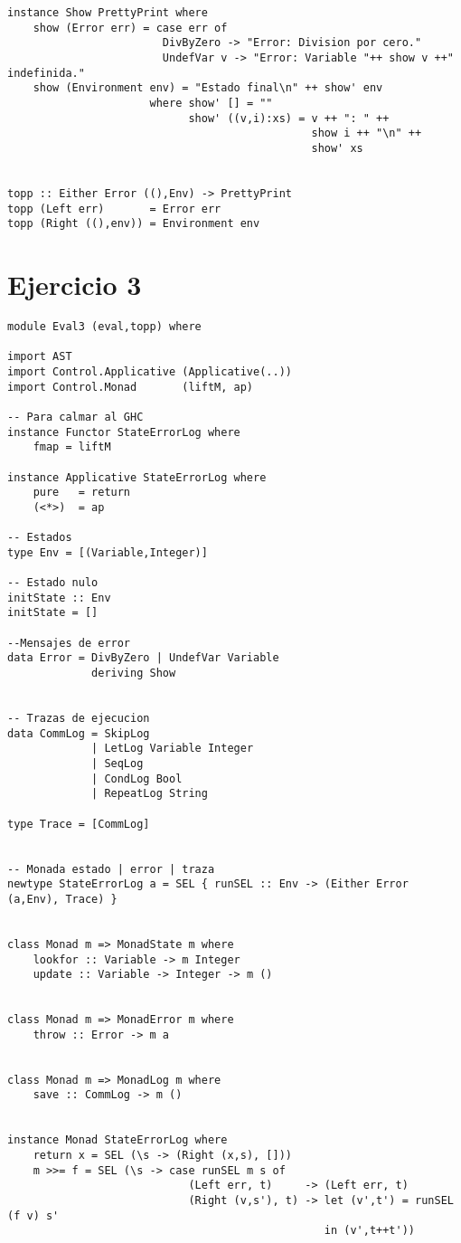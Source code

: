 \documentclass[a4paper]{report}
\begin{document}
\begin{lstlisting}
instance Show PrettyPrint where
    show (Error err) = case err of
                        DivByZero -> "Error: Division por cero."
                        UndefVar v -> "Error: Variable "++ show v ++" indefinida."
    show (Environment env) = "Estado final\n" ++ show' env
                      where show' [] = ""
                            show' ((v,i):xs) = v ++ ": " ++
                                               show i ++ "\n" ++
                                               show' xs


topp :: Either Error ((),Env) -> PrettyPrint
topp (Left err)       = Error err
topp (Right ((),env)) = Environment env

\end{lstlisting}

\pagebreak

\section*{Ejercicio 3}
\begin{lstlisting}
module Eval3 (eval,topp) where

import AST
import Control.Applicative (Applicative(..))
import Control.Monad       (liftM, ap)

-- Para calmar al GHC
instance Functor StateErrorLog where
    fmap = liftM

instance Applicative StateErrorLog where
    pure   = return
    (<*>)  = ap

-- Estados
type Env = [(Variable,Integer)]

-- Estado nulo
initState :: Env
initState = []

--Mensajes de error
data Error = DivByZero | UndefVar Variable
             deriving Show


-- Trazas de ejecucion
data CommLog = SkipLog
             | LetLog Variable Integer
             | SeqLog
             | CondLog Bool
             | RepeatLog String

type Trace = [CommLog]


-- Monada estado | error | traza
newtype StateErrorLog a = SEL { runSEL :: Env -> (Either Error (a,Env), Trace) }


class Monad m => MonadState m where
    lookfor :: Variable -> m Integer
    update :: Variable -> Integer -> m ()


class Monad m => MonadError m where
    throw :: Error -> m a


class Monad m => MonadLog m where
    save :: CommLog -> m ()


instance Monad StateErrorLog where
    return x = SEL (\s -> (Right (x,s), []))
    m >>= f = SEL (\s -> case runSEL m s of
                            (Left err, t)     -> (Left err, t)
                            (Right (v,s'), t) -> let (v',t') = runSEL (f v) s'
                                                 in (v',t++t'))

\end{lstlisting}
\end{document}
